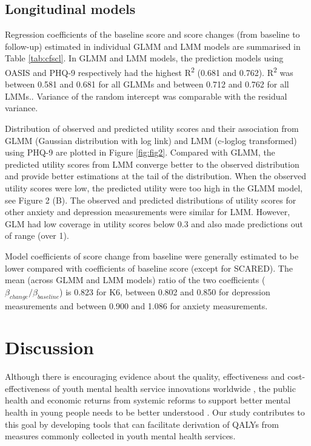 \documentclass[
  journal=largetwo,
  manuscript=original-article,
  year=2023-Submission,
]{cup-journal}
\begin{document}
\subsection{Longitudinal models}

Regression coefficients of the baseline score and score changes (from baseline to follow-up) estimated in individual GLMM and LMM models are summarised in Table \ref{tab:cfscl}. In GLMM and LMM models, the prediction models using OASIS and PHQ-9 respectively had the highest R\textsuperscript{2} (0.681 and 0.762). R\textsuperscript{2} was between 0.581 and 0.681 for all GLMMs and between 0.712 and 0.762 for all LMMs.. Variance of the random intercept was comparable with the residual variance.

Distribution of observed and predicted utility scores and their association from GLMM (Gaussian distribution with log link) and LMM (c-loglog transformed) using PHQ-9 are plotted in Figure \ref{fig:fig2}. Compared with GLMM, the predicted utility scores from LMM converge better to the observed distribution and provide better estimations at the tail of the distribution. When the observed utility scores were low, the predicted utility were too high in the GLMM model, see Figure 2 (B). The observed and predicted distributions of utility scores for other anxiety and depression measurements were similar for LMM. However, GLM had low coverage in utility scores below 0.3 and also made predictions out of range (over 1).

Model coefficients of score change from baseline were generally estimated to be lower compared with coefficients of baseline score (except for SCARED). The mean (across GLMM and LMM models) ratio of the two coefficients (\({\beta}_{change}/{\beta}_{baseline}\)) is 0.823 for K6, between 0.802 and 0.850 for depression measurements and between 0.900 and 1.086 for anxiety measurements.

\section{Discussion}

Although there is encouraging evidence about the quality, effectiveness and cost-effectiveness of youth mental health service innovations worldwide \autocite{RN1027,RN1033}, the public health and economic returns from systemic reforms to support better mental health in young people needs to be better understood \autocite{RN1043}. Our study contributes to this goal by developing tools that can facilitate derivation of QALYs from measures commonly collected in youth mental health services.
\end{document}
